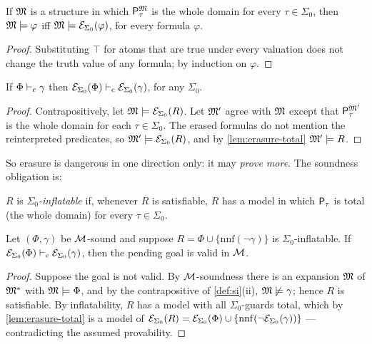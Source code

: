 \begin{lemma}
\label{lem:erasure-total}
If $\mathfrak{M}$ is a structure in which $\mathsf{P}_{\tau}^{\mathfrak{M}}$ is the whole
domain for every $\tau \in \Sigma_0$, then $\mathfrak{M} \models \varphi$
iff $\mathfrak{M} \models \mathcal{E}_{\Sigma_0}(\varphi)$, for every formula
$\varphi$.
\end{lemma}

\begin{proof}
Substituting $\top$ for atoms that are true under every valuation
does not change the truth value of any formula; by induction on
$\varphi$.
\end{proof}

\begin{proposition}
\label{prop:erasure-complete}
If $\Phi \vdash_{\mathrm{c}} \gamma$ then $\mathcal{E}_{\Sigma_0}(\Phi) \vdash_{\mathrm{c}}
\mathcal{E}_{\Sigma_0}(\gamma)$, for any $\Sigma_0$.
\end{proposition}

\begin{proof}
Contrapositively, let $\mathfrak{M} \models \mathcal{E}_{\Sigma_0}(R)$.  Let
$\mathfrak{M}'$ agree with $\mathfrak{M}$ except that $\mathsf{P}_{\tau}^{\mathfrak{M}'}$ is the
whole domain for each $\tau \in \Sigma_0$.  The erased formulas do
not mention the reinterpreted predicates, so $\mathfrak{M}' \models
\mathcal{E}_{\Sigma_0}(R)$, and by \cref{lem:erasure-total} $\mathfrak{M}'
\models R$.
\end{proof}

So erasure is dangerous in one direction only: it may \emph{prove
more}.  The soundness obligation is:

\begin{definition}[Inflatability]
\label{def:inflatable}
$R$ is \emph{$\Sigma_0$-inflatable} if, whenever $R$ is
satisfiable, $R$ has a model in which $\mathsf{P}_{\tau}$ is total (the
whole domain) for every $\tau \in \Sigma_0$.
\end{definition}

\begin{theorem}
\label{thm:erasure-from-inflatable}
Let $(\Phi, \gamma)$ be $\mathcal{M}$-sound and suppose $R = \Phi \cup
\{\mathrm{nnf}(\neg\gamma)\}$ is $\Sigma_0$-inflatable.  If
$\mathcal{E}_{\Sigma_0}(\Phi) \vdash_{\mathrm{c}} \mathcal{E}_{\Sigma_0}(\gamma)$, then
the pending goal is valid in $\mathcal{M}$.
\end{theorem}

\begin{proof}
Suppose the goal is not valid.  By $\mathcal{M}$-soundness there is an
expansion $\mathfrak{M}$ of $\mathfrak{M}^{*}$ with $\mathfrak{M} \models \Phi$, and by the
contrapositive of \cref{def:si}(ii), $\mathfrak{M} \not\models \gamma$;
hence $R$ is satisfiable.  By inflatability, $R$ has a model with
all $\Sigma_0$-guards total, which by \cref{lem:erasure-total} is a
model of $\mathcal{E}_{\Sigma_0}(R) = \mathcal{E}_{\Sigma_0}(\Phi) \cup
\{\mathrm{nnf}(\neg\mathcal{E}_{\Sigma_0}(\gamma))\}$ --- contradicting
the assumed provability.
\end{proof}

